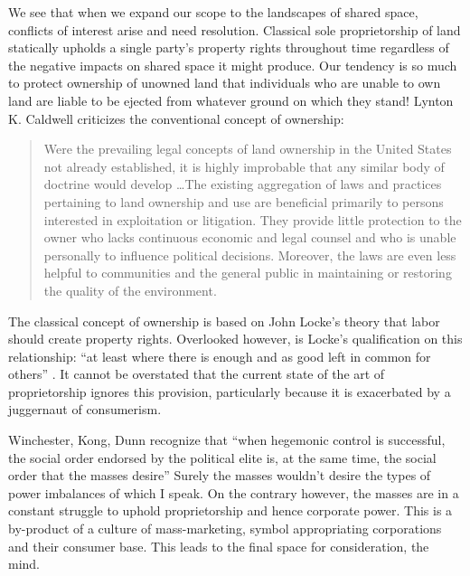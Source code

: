 \documentclass[12pt, letterpaper, oneside]{article}
\begin{document}
We see that when we expand our scope to the landscapes of shared space, conflicts of interest arise and need resolution. Classical sole proprietorship of land statically upholds a single party's property rights throughout time regardless of the negative impacts on shared space it might produce. Our tendency is so much to protect ownership of unowned land that individuals who are unable to own land are liable to be ejected from whatever ground on which they stand! Lynton K. Caldwell criticizes the conventional concept of ownership:
\begin{quote}
Were the prevailing legal concepts of land ownership in the United States not already established, it is highly improbable that any similar body of doctrine would develop \ldots The existing aggregation of laws and practices pertaining to land ownership and use are beneficial primarily to persons interested in exploitation or litigation. They provide little protection to the owner who lacks continuous economic and legal counsel and who is unable personally to influence political decisions. Moreover, the laws are even less helpful to communities and the general public in maintaining or restoring the quality of the environment.

\autocite{caldwell1973rights}
\end{quote}
The classical concept of ownership is based on John Locke's theory that labor should create property rights. Overlooked however, is Locke's qualification on this relationship: ``at least where there is enough and as good left in common for others'' \autocite{locke1965two}. It cannot be overstated that the current state of the art of proprietorship ignores this provision, particularly because it is exacerbated by a juggernaut of consumerism.

Winchester, Kong, Dunn recognize that ``when hegemonic control is successful, the social order endorsed by the political elite is, at the same time, the social order that the masses desire'' \autocite{winchester2013landscapes} Surely the masses wouldn't desire the types of power imbalances of which I speak. On the contrary however, the masses are in a constant struggle to uphold proprietorship and hence corporate power. This is a by-product of a culture of mass-marketing, symbol appropriating corporations and their consumer base. This leads to the final space for consideration, the mind.
\end{document}
